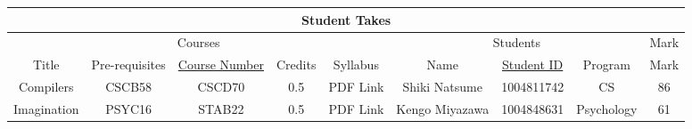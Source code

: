 \documentclass[12pt]{article}
\begin{document}
\newpage
\begin{center}
    \begin{tabular}{|c|c|c|c|c||c|c|c||c|}
        \hline
        \multicolumn{9}{|c|}{\cellcolor{gray!25}Student Takes}                                                                                                       \\
        \hline
        \hline
        \multicolumn{5}{|c||}{\cellcolor{gray!25}Courses}
                    & \multicolumn{3}{c||}{\cellcolor{gray!25}Students} & {\cellcolor{gray!25}Mark}                                                                  \\
        \hline
        \cellcolor{gray!25}Title
                    & \cellcolor{gray!25}Pre-requisites
                    & \cellcolor{gray!25}\underline{Course Number}
                    & \cellcolor{gray!25}Credits
                    & \cellcolor{gray!25}Syllabus

                    & \cellcolor{gray!25}Name
                    & \cellcolor{gray!25}\underline{Student ID}
                    & \cellcolor{gray!25}Program
                    & \cellcolor{gray!25}Mark
        \\
        \hline \hline
        Compilers   & CSCB58                                            & CSCD70                    & 0.5 & PDF Link & Shiki Natsume  & 1004811742 & CS         & 86 \\ \hline
        Imagination & PSYC16                                            & STAB22                    & 0.5 & PDF Link & Kengo Miyazawa & 1004848631 & Psychology & 61 \\ \hline
    \end{tabular}
\end{center}
\end{document}
